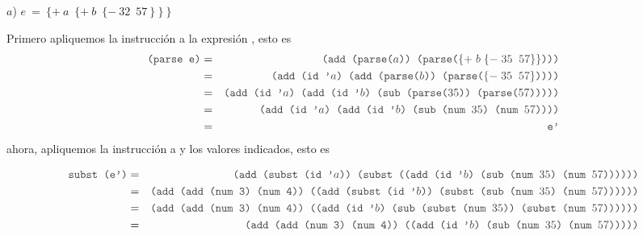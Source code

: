 \vspace*{0.3cm}
$a$) $e\: =\: \{+\: a\:\; \{+\: b\:\; \{-\: 32\:\; 57\: \}\: \}\: \}$ \newline
\hspace*{0.5cm}    \newline

\hspace*{0.3cm} Primero apliquemos la instrucción  a la expresión
, esto es
\begin{eqnarray*}
  \text{\code{(parse e)}} &=& \code{(add (parse($a$)) (parse($\{+\; b\; \{-\; 35\;\; 57\}\}$)))}\\
  &=& \code{(add (id '$a$) (add (parse($b$)) (parse($\{-\; 35\;\; 57\}$))))}\\
  &=& \code{(add (id '$a$) (add (id '$b$) (sub (parse($35$)) (parse($57$)))))}\\
  &=& \code{(add (id '$a$) (add (id '$b$) (sub (num $35$) (num $57$))))}\\
  &=& \code{e'}
\end{eqnarray*}
ahora, apliquemos la instrucción  a  y los valores indicados,
esto es

\begin{center}
\end{center}

\begin{eqnarray*}
  \code{subst (e')} &=& \code{(add (subst (id '$a$))
    (subst ((add (id '$b$) (sub (num $35$) (num $57$))))))}\\
  &=& \code{(add (add (num 3) (num 4))
    ((add (subst (id '$b$)) (subst (sub (num $35$) (num $57$))))))}\\
  &=& \code{(add (add (num 3) (num 4))
    ((add  (id '$b$)  (sub (subst (num $35$)) (subst (num $57$))))))}\\
    &=& \code{(add (add (num 3) (num 4))
    ((add  (id '$b$)  (sub (num $35$) (num $57$)))))}
\end{eqnarray*}

